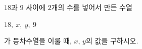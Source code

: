 $18$과 $9$ 사이에 $2$개의 수를 넣어서 만든 수열\par\smallskip\noindent\hspace*{1.5em}$18,\ x,\ y,\ 9$\par\smallskip\noindent 가 등차수열을 이룰 때, $x$, $y$의 값을 구하시오.
